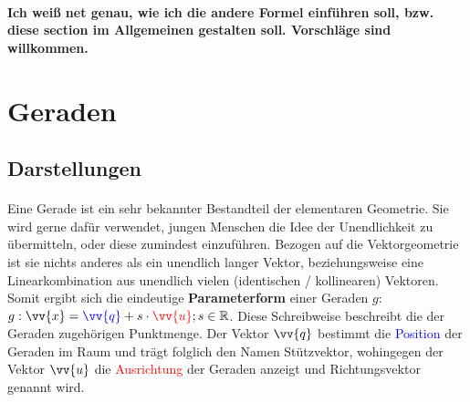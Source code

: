     \paragraph{} \textbf{Ich weiß net genau, wie ich die andere Formel einführen soll, bzw. diese section im Allgemeinen gestalten soll.
     Vorschläge sind willkommen.}

\section{Geraden}

    \subsection{Darstellungen}

        \paragraph{} Eine Gerade ist ein sehr bekannter Bestandteil der elementaren Geometrie. Sie wird gerne dafür verwendet, jungen Menschen die Idee
        der Unendlichkeit zu übermitteln, oder diese zumindest einzuführen. Bezogen auf die Vektorgeometrie ist sie nichts anderes als ein unendlich
        langer Vektor, beziehungsweise eine Linearkombination aus unendlich vielen (identischen / kollinearen) Vektoren. Somit ergibt sich die eindeutige
        \textbf{Parameterform} einer Geraden $g$: $g:\vv{x}=\textcolor{blue}{\vv{q}}+s\cdot\textcolor{red}{\vv{u}};s\in\R$. Diese Schreibweise beschreibt die der Geraden zugehörigen
        Punktmenge. Der Vektor $\vv{q}$ bestimmt die \textcolor{blue}{Position} der Geraden im Raum und trägt folglich den Namen Stützvektor, wohingegen der Vektor
        $\vv{u}$ die \textcolor{red}{Ausrichtung} der Geraden anzeigt und Richtungsvektor genannt wird.

